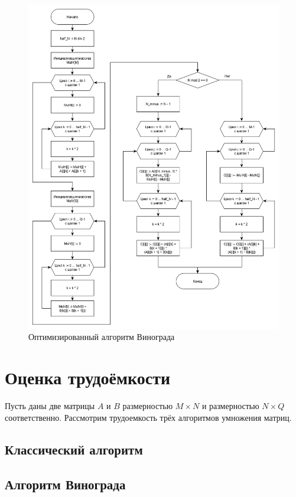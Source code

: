 \documentclass[12pt, a4paper]{report}
\begin{document}
	\begin{figure}[ht!]
		\centering
		\includegraphics[scale=0.55]{vin_opt.jpg}
		\caption{Оптимизированный алгоритм Винограда}
		\label{fig:optvin}
	\end{figure}

	\newpage

	\section{Оценка трудоёмкости}
	Пусть даны две матрицы $A$ и $B$ размерностью $M\times N$ и размерностью $N \times Q$ соответственно. Рассмотрим трудоемкость трёх алгоритмов умножения матриц.
	\subsection{Классический алгоритм}
	\subsection{Алгоритм Винограда}
\end{document}
